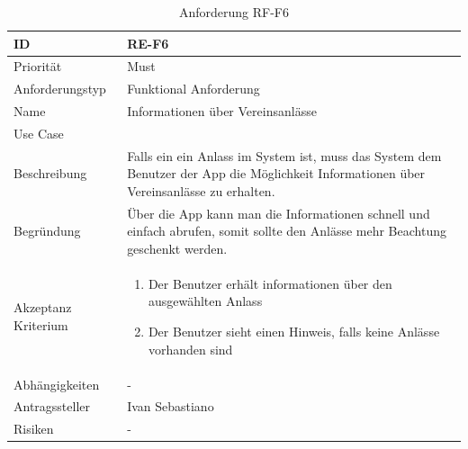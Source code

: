 \begin{table}[ht]
\centering
  \begin{tabular}{ l | p{8cm} }
	\hline
	\rowcolor{gray}
	ID 			&	\textbf{RE-F6}\\ \hline
	Priorität 		&	Must\\ \hline
	Anforderungstyp	&	Funktional Anforderung\\ \hline
	Name 			&	Informationen über Vereinsanlässe\\ \hline
	Use Case 		&	\nameref{table:use_case_5}\\ \hline
	Beschreibung 	&	Falls ein ein Anlass im System ist, muss das System dem Benutzer der App die Möglichkeit Informationen über Vereinsanlässe zu erhalten.\\ \hline
	Begründung 		&	Über die App kann man die Informationen schnell und einfach abrufen, somit sollte den Anlässe mehr Beachtung geschenkt werden.\\ \hline
	Akzeptanz Kriterium	&	\begin{enumerate}
					\item Der Benutzer erhält informationen über den ausgewählten Anlass
					\item Der Benutzer sieht einen Hinweis, falls keine Anlässe vorhanden sind
					\end{enumerate}
					\\ \hline
	Abhängigkeiten 	&	-\\ \hline
	Antragssteller 	&	Ivan Sebastiano\\ \hline
	Risiken	 	&	-
  \end{tabular}
   \caption{Anforderung RF-F6}\label{table:req_6}
\end{table}


